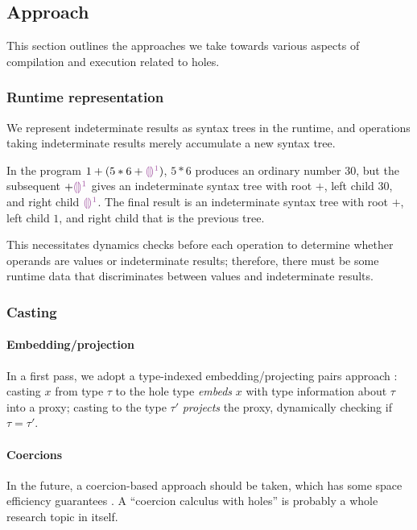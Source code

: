 \documentclass[index.tex]{subfiles}
\begin{document}
\subsection{Approach}
\label{sec:approach}
This section outlines the approaches we take towards various aspects of compilation and execution
related to holes.

\subsubsection{Runtime representation}
\label{sec:runtime-representation}
We represent indeterminate results as syntax trees in the runtime, and operations taking
indeterminate results merely accumulate a new syntax tree.
%
\begin{example}
  In the program $1 + (5 * 6 + \SyEHole{1}{})$, $5 * 6$ produces an ordinary number $30$, but the
  subsequent $+ \SyEHole{1}{}$ gives an indeterminate syntax tree with root $+$, left child $30$, and
  right child $\SyEHole{1}{}$. The final result is an indeterminate syntax tree with root $+$, left
  child $1$, and right child that is the previous tree.
\end{example}
%
\noindent This necessitates dynamics checks before each operation to determine whether operands are
values or indeterminate results; therefore, there must be some runtime data that discriminates
between values and indeterminate results.

\subsubsection{Casting}
\label{sec:casting}

\paragraph{Embedding/projection}
In a first pass, we adopt a type-indexed embedding/projecting pairs approach \cite{benton2005,
new2018}: casting $x$ from type $\tau$ to the hole type \emph{embeds} $x$ with type information
about $\tau$ into a proxy; casting to the type $\tau'$ \emph{projects} the proxy, dynamically
checking if $\tau = \tau'$.

\paragraph{Coercions}
In the future, a coercion-based approach should be taken, which has some space efficiency guarantees
\cite{herman2010, kuhlenschmidt2019}. A ``coercion calculus with holes'' is probably a whole
research topic in itself.
\end{document}

